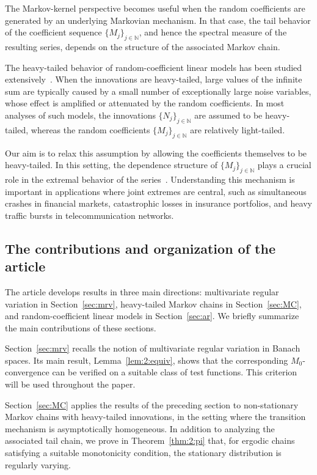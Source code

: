 \documentclass[preprint,12pt]{elsarticle}
\theoremstyle{definition}
\theoremstyle{remark}
\newcommand{\1}{{\mathbf 1}}
\numberwithin{equation}{section}
\begin{document}
  The Markov-kernel perspective becomes useful when the random coefficients are generated 
  by an underlying Markovian mechanism. In that case, the tail behavior of the coefficient 
  sequence $\{M_j\}_{j\in \mathbb{N}}$, 
  and hence the spectral measure of the resulting series, depends on the structure of the associated Markov chain.

  The heavy-tailed behavior of random-coefficient linear models has been studied 
  extensively~\cite{hult2008tail,davis1995point}. When the innovations are heavy-tailed, 
  large values of the infinite sum are typically caused by a small number of 
  exceptionally large noise variables, whose effect is amplified or attenuated by the random coefficients. 
  In most analyses of such models, the innovations 
  $\{N_j\}_{j \in \mathbb{N}}$ are assumed to be heavy-tailed, whereas the random 
  coefficients $\{M_j\}_{j \in \mathbb{N}}$ are relatively light-tailed.

  Our aim is to relax this assumption by allowing the coefficients themselves to be heavy-tailed. 
  In this setting, the dependence structure of $\{M_j\}_{j \in \mathbb{N}}$ plays a crucial role 
  in the extremal behavior of the series~\cite{mikosch2016large}. 
  Understanding this mechanism is important in applications where joint extremes are central, 
  such as simultaneous crashes in financial markets, catastrophic losses in insurance portfolios, 
  and heavy traffic bursts in telecommunication networks.

\subsection{The contributions and organization of the article}

  The article develops results in three main directions: multivariate regular variation in Section~\ref{sec:mrv}, 
  heavy-tailed Markov chains in Section~\ref{sec:MC}, and random-coefficient linear models in Section~\ref{sec:ar}. 
  We briefly summarize the main contributions of these sections.

  Section~\ref{sec:mrv} recalls the notion of multivariate regular variation in Banach spaces. 
  Its main result, Lemma~\ref{lem:2:equiv}, shows that the corresponding $M_0$-convergence can be 
  verified on a suitable class of test functions. This criterion will be used throughout the paper.

  Section~\ref{sec:MC} applies the results of the preceding section to non-stationary Markov chains with 
  heavy-tailed innovations, in the setting where the transition mechanism is asymptotically homogeneous. 
  In addition to analyzing the associated tail chain, we prove in Theorem~\ref{thm:2:pi} that, 
  for ergodic chains satisfying a suitable monotonicity condition, the stationary distribution is regularly varying.
\end{document}
